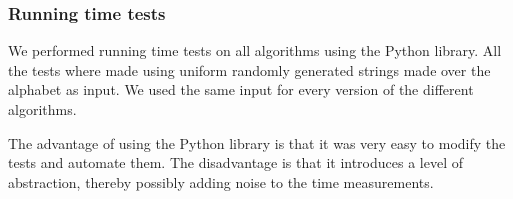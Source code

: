 \subsubsection{Running time tests}\label{sec:runningtimetests}
We performed running time tests on all algorithms using the Python library. All the tests where made using uniform randomly generated strings made over the alphabet as input. We used the same input for every version of the different algorithms.

The advantage of using the Python library is that it was very easy to modify the tests and automate them. The disadvantage is that it introduces a level of abstraction, thereby possibly adding noise to the time measurements.





